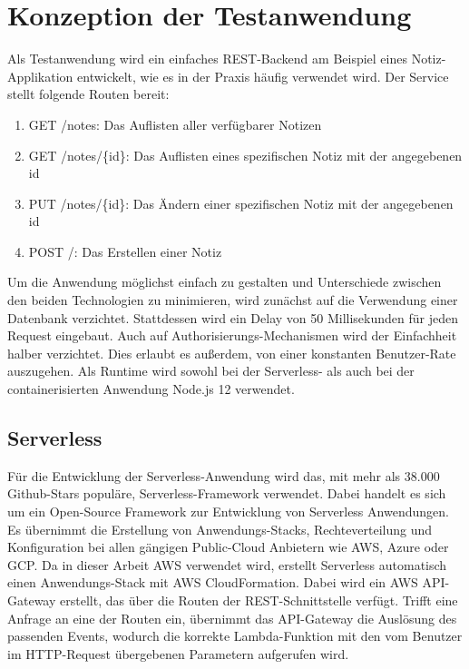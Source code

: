 \section{Konzeption der Testanwendung}
Als Testanwendung wird ein einfaches REST-Backend am Beispiel eines Notiz-Applikation entwickelt, wie es in der Praxis häufig verwendet wird. Der Service stellt folgende Routen bereit:  

\begin{enumerate}
    \item GET /notes: Das Auflisten aller verfügbarer Notizen
    \item GET /notes/\{id\}: Das Auflisten eines spezifischen Notiz mit der angegebenen id
    \item PUT /notes/\{id\}: Das Ändern einer spezifischen Notiz mit der angegebenen id
    \item POST /: Das Erstellen einer Notiz
\end{enumerate}

Um die Anwendung möglichst einfach zu gestalten und Unterschiede zwischen den beiden Technologien zu minimieren, wird zunächst auf die Verwendung einer Datenbank verzichtet. Stattdessen wird ein Delay von 50 Millisekunden für jeden Request eingebaut. 
Auch auf Authorisierungs-Mechanismen wird der Einfachheit halber verzichtet. Dies erlaubt es außerdem, von einer konstanten Benutzer-Rate auszugehen\cite{molyneaux_art_2014}. 
Als Runtime wird sowohl bei der Serverless- als auch bei der containerisierten Anwendung Node.js 12 verwendet.

\subsection{Serverless}
Für die Entwicklung der Serverless-Anwendung wird das, mit mehr als 38.000 Github-Stars populäre, Serverless-Framework\cite{noauthor_serverless_nodate} verwendet. Dabei handelt es sich um ein Open-Source Framework zur Entwicklung von Serverless Anwendungen. Es übernimmt die Erstellung von Anwendungs-Stacks, Rechteverteilung und Konfiguration bei allen gängigen Public-Cloud Anbietern wie AWS, Azure oder GCP. Da in dieser Arbeit AWS verwendet wird, erstellt Serverless automatisch einen Anwendungs-Stack mit AWS CloudFormation. Dabei wird ein AWS API-Gateway erstellt, das über die Routen der REST-Schnittstelle verfügt. Trifft eine Anfrage an eine der Routen ein, übernimmt das API-Gateway die Auslösung des passenden Events, wodurch die korrekte Lambda-Funktion mit den vom Benutzer im HTTP-Request übergebenen Parametern aufgerufen wird. 

